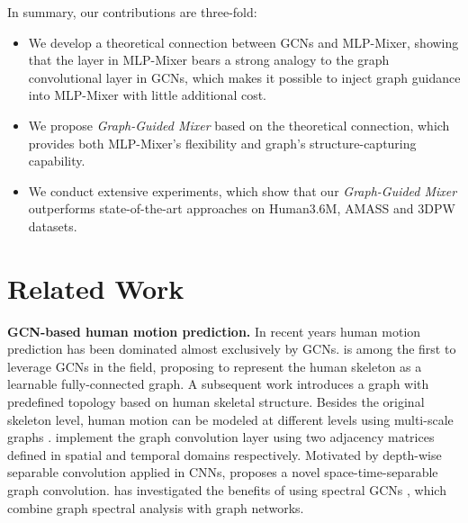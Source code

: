 \documentclass[10pt,twocolumn,letterpaper]{article}
\begin{document}
    In summary, our contributions are three-fold:
    \begin{itemize}
        \item We develop a theoretical connection between GCNs and MLP-Mixer, showing that the layer in MLP-Mixer bears a strong analogy to the graph convolutional layer in GCNs, which makes it possible to inject graph guidance into MLP-Mixer with little additional cost.
\item We propose \textit{Graph-Guided Mixer} based on the theoretical connection, which provides both MLP-Mixer's flexibility and graph's structure-capturing capability.
        \item We conduct extensive experiments, which show that our \textit{Graph-Guided Mixer} outperforms state-of-the-art approaches on Human3.6M, AMASS and 3DPW datasets.
    \end{itemize}





    
    





    
    









\section{Related Work}
\noindent\textbf{GCN-based human motion prediction.}
    In recent years human motion prediction has been dominated almost exclusively by GCNs. \cite{mao2019learning} is among the first to leverage GCNs in the field, proposing to represent the human skeleton as a learnable fully-connected graph.
    A subsequent work \cite{cui2020learning} introduces a graph with predefined topology based on human skeletal structure. Besides the original skeleton level, human motion can be modeled at different levels using multi-scale graphs \cite{li2020dynamic,dang2021msr,li2021multiscale,zhou2021learning}.
    \cite{li2021multiscale,ma2022progressively} implement the graph convolution layer using two adjacency matrices defined in spatial and temporal domains respectively.
    Motivated by depth-wise separable convolution \cite{chollet2017xception} applied in CNNs, \cite{sofianos2021space} proposes a novel space-time-separable graph convolution.
    \cite{li2021skeleton,li2022skeleton} has investigated the benefits of using spectral GCNs \cite{bruna2013spectral}, which combine graph spectral analysis with graph networks.
\end{document}
